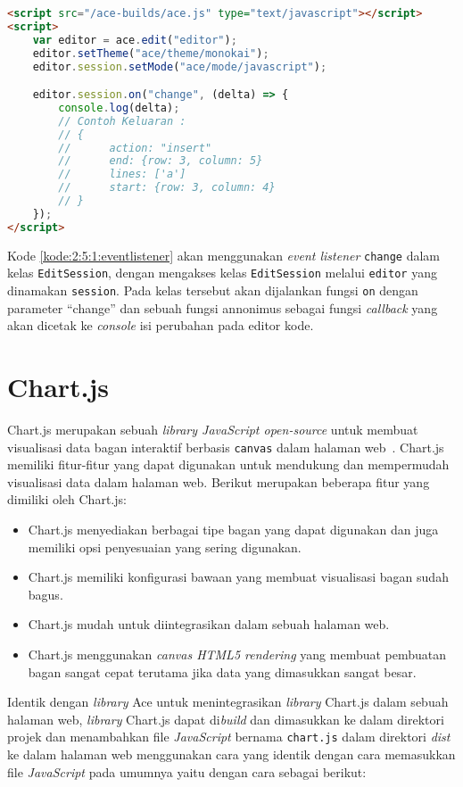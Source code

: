 \begin{lstlisting}[language={html}, caption={Contoh kode event listener}, label={kode:2:5:1:eventlistener}]
<script src="/ace-builds/ace.js" type="text/javascript"></script>
<script>
	var editor = ace.edit("editor");
	editor.setTheme("ace/theme/monokai");
	editor.session.setMode("ace/mode/javascript");

	editor.session.on("change", (delta) => {
        console.log(delta);
		// Contoh Keluaran :
		// {
		// 		action: "insert"
		// 		end: {row: 3, column: 5}
		// 		lines: ['a']
		// 		start: {row: 3, column: 4}
		// }
	});
</script>
\end{lstlisting}

Kode \ref{kode:2:5:1:eventlistener} akan menggunakan \textit{event listener} \verb|change| dalam kelas \verb|EditSession|, dengan mengakses kelas \verb|EditSession| melalui \verb|editor| yang dinamakan \verb|session|. Pada kelas tersebut akan dijalankan fungsi \verb|on| dengan parameter ``change'' dan sebuah fungsi annonimus sebagai fungsi \textit{callback} yang akan dicetak ke \textit{console} isi perubahan pada editor kode.

\section{Chart.js}

Chart.js merupakan sebuah \textit{library JavaScript open-source} untuk membuat visualisasi data bagan interaktif berbasis \verb|canvas| dalam halaman web~\cite{chartjs}. Chart.js memiliki fitur-fitur yang dapat digunakan untuk mendukung dan mempermudah visualisasi data dalam halaman web. Berikut merupakan beberapa fitur yang dimiliki oleh Chart.js:

\begin{itemize}
	\item Chart.js menyediakan berbagai tipe bagan yang dapat digunakan dan juga memiliki opsi penyesuaian yang sering digunakan.
	\item Chart.js memiliki konfigurasi bawaan yang membuat visualisasi bagan sudah bagus.
	\item Chart.js mudah untuk diintegrasikan dalam sebuah halaman web.
	\item Chart.js menggunakan \textit{canvas HTML5 rendering} yang membuat pembuatan bagan sangat cepat terutama jika data yang dimasukkan sangat besar.
\end{itemize}
 
Identik dengan \textit{library} Ace untuk menintegrasikan \textit{library} Chart.js dalam sebuah halaman web, \textit{library} Chart.js dapat di\textit{build} dan dimasukkan ke dalam direktori projek dan menambahkan file \textit{JavaScript} bernama \verb|chart.js| dalam direktori \textit{dist} ke dalam halaman web menggunakan cara yang identik dengan cara memasukkan file \textit{JavaScript} pada umumnya yaitu dengan cara sebagai berikut:

